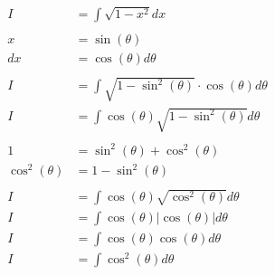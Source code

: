 \documentclass[12pt]{article}
\begin{document}
\begin{align}
    I                               & = \int \sqrt{1-x^2} dx                                                             \\
    \nonumber                                                                                                            \\
    x                               & = \sin(\theta)                                                                     \\
    dx                              & = \cos(\theta) d\theta                                                             \\
    \nonumber                                                                                                            \\
    I                               & = \int \sqrt{1-\sin^2(\theta)} \cdot \cos(\theta) d\theta                          \\
    I                               & = \int \cos(\theta)\sqrt{1-\sin^2(\theta)} d\theta                                 \\
    \nonumber                                                                                                            \\
    1                               & = \sin^2(\theta) + \cos^2(\theta)                                                  \\
    \cos^2(\theta)                  & = 1 - \sin^2(\theta)                                                               \\
    \nonumber                                                                                                            \\
    I                               & = \int \cos(\theta)\sqrt{\cos^2(\theta)} d\theta                                   \\
    I                               & = \int \cos(\theta)|\cos(\theta)| d\theta                                          \\
    I                               & = \int \cos(\theta)\cos(\theta) d\theta                                            \\
    I                               & = \int \cos^2(\theta) d\theta                                                      \\
    \nonumber                                                                                                            \\

\end{align}
\end{document}
